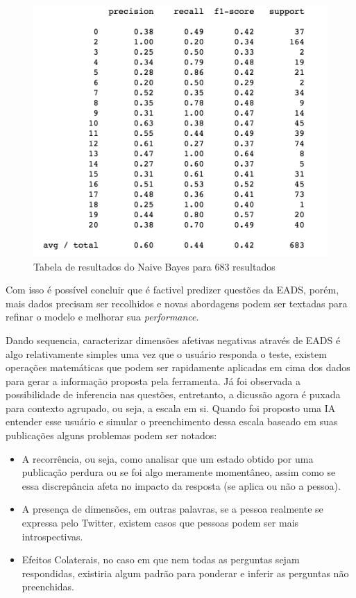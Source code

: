 \begin{figure}[!ht]
    \centering
    \includegraphics[width=.6\textwidth]{imagens/prediction.png}
    \caption{Tabela de resultados do Naive Bayes para 683 resultados}
    \label{fig:prediction}
\end{figure}

Com isso é possível concluir que é factivel predizer questões da EADS, porém, mais dados precisam ser recolhidos e novas abordagens podem ser textadas para refinar o modelo e melhorar sua \textit{performance}.

Dando sequencia, caracterizar dimensões afetivas negativas através de EADS é algo relativamente simples uma vez que o usuário responda o teste, existem operações matemáticas que podem ser rapidamente aplicadas em cima dos dados para gerar a informação proposta pela ferramenta. Já foi observada a possibilidade de inferencia nas questões, entretanto, a dicussão agora é puxada para contexto agrupado, ou seja, a escala em si. Quando foi proposto uma IA entender esse usuário e simular o preenchimento dessa escala baseado em suas publicações alguns problemas podem ser notados:

\begin{itemize}
    \item A recorrência, ou seja, como analisar que um estado obtido por uma publicação perdura ou se foi algo meramente momentâneo, assim como se essa discrepância afeta no impacto da resposta (se aplica ou não a pessoa).
    \item A presença de dimensões, em outras palavras, se a pessoa realmente se expressa pelo Twitter, existem casos que pessoas podem ser mais introspectivas.
    \item Efeitos Colaterais, no caso em que nem todas as perguntas sejam respondidas, existiria algum padrão para ponderar e inferir as perguntas não preenchidas.
\end{itemize}

